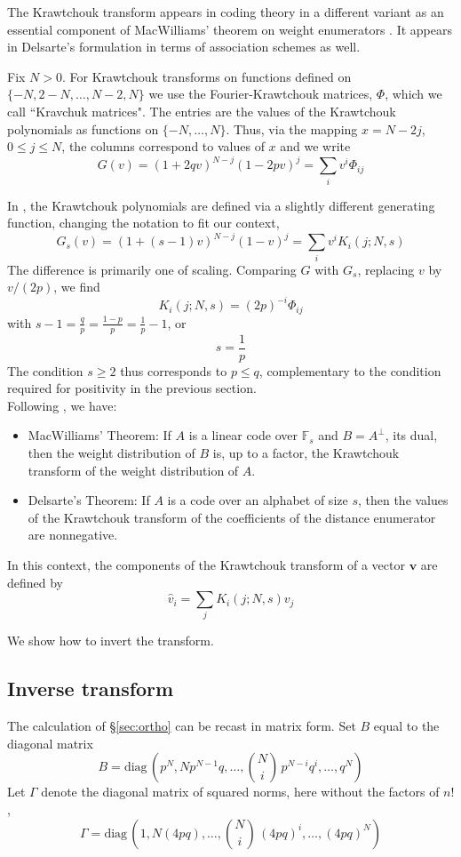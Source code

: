 \documentclass[runningheads]{llncs}
\def\v{{\mathbf v}}
\begin{document}
The Krawtchouk transform appears in coding theory in a different variant as an essential component of MacWilliams' theorem
on weight enumerators \cite{H,SMcW}. It appears in Delsarte's formulation in terms of association schemes as well. 

Fix $N>0$. For Krawtchouk transforms on functions defined on $\{-N, 2-N, \ldots, N-2, N\}$ we use the Fourier-Krawtchouk matrices, $\Phi$,
which we call ``Kravchuk matrices". The entries are the values of the Krawtchouk polynomials as functions on $\{-N,\ldots,N\}$. Thus,
via the mapping $x=N-2j$, $0\le j\le N$, the columns correspond to values of $x$ and we write
$$G(v)=(1+2qv)^{N-j}(1-2pv)^j=\sum_i v^i\Phi_{ij}$$

In \cite{H}, the Krawtchouk polynomials are defined via a slightly different generating function, changing the notation to fit our context,
$$G_s(v)=(1+(s-1)v)^{N-j}(1-v)^j=\sum_i v^i K_i(j;N,s)$$
The difference is primarily one of scaling. Comparing $G$ with $G_s$, replacing $v$ by $v/(2p)$, we find
$$K_i(j;N,s)=(2p)^{-i}\Phi_{ij}$$
with $s-1=\frac{q}{p}=\frac{1-p}{p}=\frac{1}{p}-1$, or
 $$s=\frac{1}{p}$$
The condition $s\ge 2$ thus corresponds to $p\le q$, complementary to the condition required for positivity in the previous section.\\

Following \cite[p.\,132]{H}, we have:\bigskip
\begin{itemize}     
\item MacWilliams' Theorem: If $A$ is a linear code over $\mathbb{F}_s$ and $B=A^\bot$, its dual, then the weight distribution of $B$ is, up to a factor,
the Krawtchouk transform of the weight distribution of $A$.

\item Delsarte's Theorem: If $A$ is a code over an alphabet of size $s$, then the values of the Krawtchouk transform of
the coefficients of the distance enumerator are nonnegative.
\end{itemize}

In this context, the components of the Krawtchouk transform of a vector $\v$ are defined by
$$\hat v_i=\sum_j K_i(j;N,s)v_j$$

We show how to invert the transform.

\subsection{Inverse transform}

The calculation of \S\ref{sec:ortho} can be recast in matrix form. Set $B$ equal to the diagonal matrix
$$B=\text{diag}\,(p^N,Np^{N-1}q,\ldots,\binom{N}{i}\,p^{N-i}q^i,\ldots,q^N)$$
Let $\Gamma$ denote the diagonal matrix of squared norms, here without the factors of $n!$,
$$\Gamma=\text{diag}\,(1,N(4pq),\ldots,\binom{N}{i}\,(4pq)^i,\ldots,(4pq)^N)$$
\end{document}
